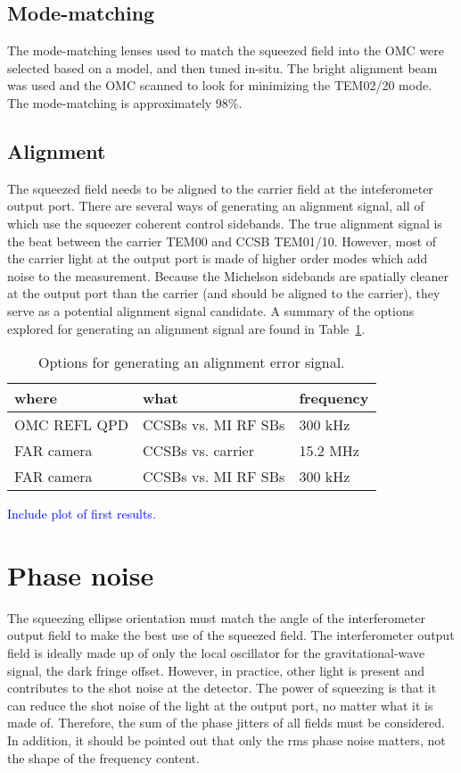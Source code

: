 \documentclass{ligodoc}
\begin{document}
\subsection{Mode-matching}
The mode-matching lenses used to match the squeezed field into the OMC
were selected based on a model, and then tuned in-situ. The bright
alignment beam was used and the OMC scanned to look for minimizing the
TEM02/20 mode. The mode-matching is approximately 98\%.


\subsection{Alignment}
The squeezed field needs to be aligned to the carrier field at the
inteferometer output port. There are several ways of generating an
alignment signal, all of which use the squeezer coherent control
sidebands. The true alignment signal is the beat between the carrier
TEM00 and CCSB TEM01/10. However, most of the carrier light at the
output port is made of higher order modes which add noise to the
measurement. Because the Michelson sidebands are spatially cleaner at
the output port than the carrier (and should be aligned to the
carrier), they serve as a potential alignment signal candidate. A
summary of the options explored for generating an alignment signal are
found in Table~\ref{tab:AA}.

\begin{table}
\centering
\caption{Options for generating an alignment error signal.}
\begin{tabular}{l l l}
\hline
where & what & frequency \\
\hline
OMC REFL QPD &     CCSBs vs. MI RF SBs & 300 kHz \\
FAR camera &          CCSBs vs. carrier & 15.2 MHz \\
FAR camera &        CCSBs vs. MI RF SBs & 300 kHz \\
\hline
\end{tabular}
\label{tab:AA}
\end{table}

\textcolor{blue}{Include plot of first results.}


\section{Phase noise}
The squeezing ellipse orientation must match the angle of the
interferometer output field to make the best use of the squeezed
field. The interferometer output field is ideally made up of only the
local oscillator for the gravitational-wave signal, the dark fringe
offset. However, in practice, other light is present and contributes
to the shot noise at the detector. The power of squeezing is that it
can reduce the shot noise of the light at the output port, no matter
what it is made of. Therefore, the sum of the phase jitters of all
fields must be considered. In addition, it should be pointed out that
only the rms phase noise matters, not the shape of the frequency
content.
\end{document}
